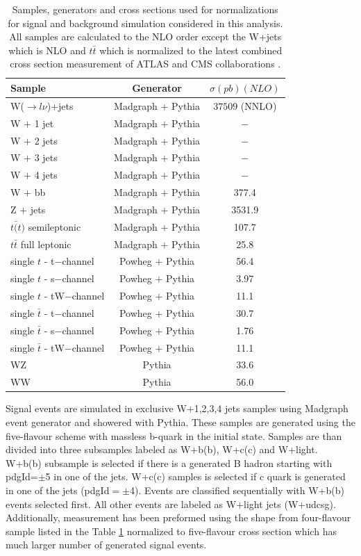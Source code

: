 \begin{table}[h]
  \centering
  \caption{Samples, generators and cross sections used for normalizations for signal and background simulation considered in this analysis. All samples are calculated to the NLO order except the W+jets which is NLO and $t\bar{t}$ which is normalized to the latest combined cross section measurement of ATLAS and CMS collaborations \cite{CMS:2014gta}. }
  \label{tab:samples}
  \begin{tabular}{ l  c c}
      \hline
      \hline
      	Sample & Generator & $\sigma(pb)(NLO)$ \\
      	\hline
    		W($\rightarrow l \nu$)+jets &  Madgraph + Pythia & $37509$ (NNLO) \\
     	W $+$ 1 jet & Madgraph $+$ Pythia & $-$ \\
     	W $+$ 2 jets & Madgraph $+$ Pythia & $-$ \\
     	W $+$ 3 jets & Madgraph $+$ Pythia & $-$ \\
     	W $+$ 4 jets & Madgraph $+$ Pythia & $-$ \\
     	W $+$ bb & Madgraph $+$ Pythia & 377.4 \\
     	\hline
     	Z $+$ jets & Madgraph $+$ Pythia &  3531.9 \\     	
     	$t\bar(t)$ semileptonic & Madgraph $+$ Pythia &  107.7 \\
     	$t\bar{t}$ full leptonic & Madgraph $+$ Pythia &  25.8 \\
     	\hline
     	single $t$ - t$-$channel & Powheg $+$ Pythia &  56.4 \\
     	single $t$ - s$-$channel & Powheg $+$ Pythia &  3.97 \\
		single $t$ - tW$-$channel & Powheg $+$ Pythia &  11.1 \\
		single $\bar{t}$ - t$-$channel & Powheg $+$ Pythia &  30.7 \\
		single $\bar{t}$ - s$-$channel & Powheg $+$ Pythia &  1.76 \\
		single $\bar{t}$ - tW$-$channel & Powheg $+$ Pythia &  11.1 \\
		\hline
		WZ & Pythia & 33.6 \\
		WW & Pythia & 56.0 \\
      \hline
      \hline 
  \end{tabular}
\end{table}

Signal events are simulated in exclusive W+1,2,3,4 jets samples using Madgraph event generator and showered with Pythia. These samples are generated using the five-flavour scheme with massless b-quark in the initial state. Samples are than divided into three subsamples labeled as W+b(b), W+c(c) and W+light. W+b(b) subsample is selected if there is a generated B hadron starting with pdgId=$\pm$5 in one of the jets. W+c(c) samples is selected if c quark is generated in one of the jets (pdgId$=\pm$4). Events are classified sequentially with W+b(b) events selected first. All other events are labeled as W+light jets (W+udcsg). Additionally, measurement has been preformed using the shape from four-flavour sample listed in the Table \ref{tab:samples} normalized to five-flavour cross section which has much larger number of generated signal events.

